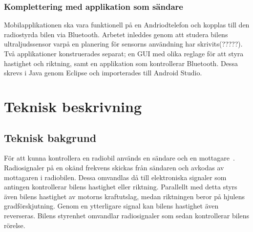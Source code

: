 \documentclass[a4paper]{article}
\begin{document}


\subsubsection{Komplettering med applikation som sändare}
\vspace{5mm} \noindent
Mobilapplikationen ska vara funktionell på en Andriodtelefon och kopplas till den radiostyrda bilen via Bluetooth. Arbetet inleddes genom att studera bilens ultraljudssensor varpå en planering för sensorns användning har skrivits(?????). Två applikationer konstruerades separat; en GUI med olika reglage för att styra hastighet och riktning, samt en applikation som kontrollerar Bluetooth. Dessa skrevs i Java genom Eclipse och importerades till Android Studio.

\newpage
\section{Teknisk beskrivning}

\subsection{Teknisk bakgrund}
För att kunna kontrollera en radiobil används en sändare och en mottagare~\cite{RCTechnique}. Radiosignaler på en okänd frekvens skickas från sändaren och avkodas av mottagaren i radiobilen. Dessa omvandlas då till elektroniska signaler som antingen kontrollerar bilens hastighet eller riktning. Parallellt med detta styrs även bilens hastighet av motorns kraftutslag, medan riktningen beror på hjulens gradförskjutning. Genom en ytterligare signal kan bilens hastighet även reverseras. Bilens styrenhet omvandlar radiosignaler som sedan kontrollerar bilens rörelse.
\end{document}
